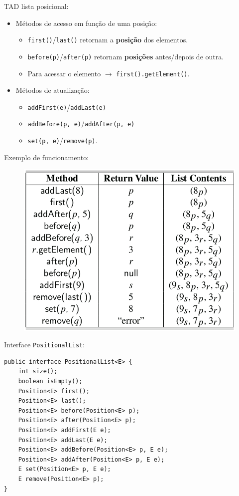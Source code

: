 \bigskip

TAD lista posicional:
\begin{itemize}
	\item Métodos de acesso em função de uma posição:
	\begin{itemize}
		\item \texttt{first()}/\texttt{last()} retornam a \textbf{posição} dos elementos.
		\item \texttt{before(p)}/\texttt{after(p)} retornam \textbf{posições} antes/depois de outra.
		\item {\color{redtext}Para acessar o elemento $\to$ \texttt{first().getElement()}.}
	\end{itemize}
	\item Métodos de atualização:
	\begin{itemize}
		\item \texttt{addFirst(e)}/\texttt{addLast(e)}
		\item \texttt{addBefore(p,\,e)}/\texttt{addAfter(p,\,e)}
		\item \texttt{set(p,\,e)}/\texttt{remove(p)}.
	\end{itemize}
\end{itemize}

\medskip

Exemplo de funcionamento:

\begin{figure}[H]
	\centering
	\includegraphics[width=0.55\linewidth]{img/table-7-4}
\end{figure}

Interface \texttt{PositionalList}:
\begin{verbatim}
public interface PositionalList<E> {
	int size();
	boolean isEmpty();
	Position<E> first();
	Position<E> last();
	Position<E> before(Position<E> p);
	Position<E> after(Position<E> p);
	Position<E> addFirst(E e);
	Position<E> addLast(E e);
	Position<E> addBefore(Position<E> p, E e);
	Position<E> addAfter(Position<E> p, E e);
	E set(Position<E> p, E e);
	E remove(Position<E> p);
}
\end{verbatim}

